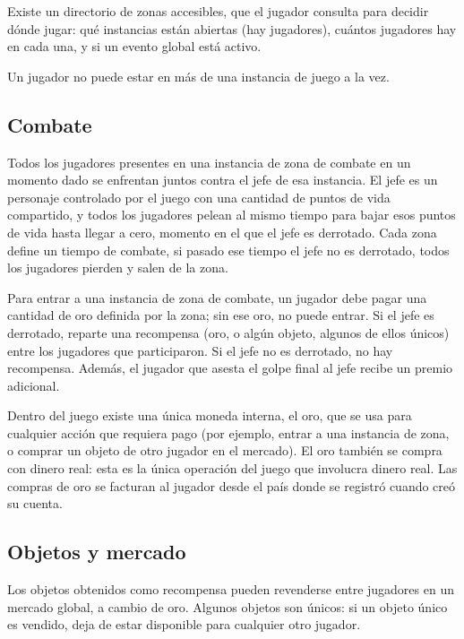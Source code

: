 \documentclass[variant=guia,cover=institutional,mode=screen]{ua-engineering-v6-article}
\begin{document}
    Existe un directorio de zonas accesibles, que el jugador consulta para decidir dónde jugar: qué instancias están abiertas (hay jugadores), cuántos jugadores hay en cada una, y si un evento global está activo.

    Un jugador no puede estar en más de una instancia de juego a la vez.

    \subsection{Combate}\label{subsec:combate}

    Todos los jugadores presentes en una instancia de zona de combate en un momento dado se enfrentan juntos contra el jefe de esa instancia.
    El jefe es un personaje controlado por el juego con una cantidad de puntos de vida compartido, y todos los jugadores pelean al mismo tiempo para bajar esos puntos de vida hasta llegar a cero, momento en el que el jefe es derrotado.
    Cada zona define un tiempo de combate, si pasado ese tiempo el jefe no es derrotado, todos los jugadores pierden y salen de la zona.

    Para entrar a una instancia de zona de combate, un jugador debe pagar una cantidad de oro definida por la zona; sin ese oro, no puede entrar.
    Si el jefe es derrotado, reparte una recompensa (oro, o algún objeto, algunos de ellos únicos) entre los jugadores que participaron.
    Si el jefe no es derrotado, no hay recompensa.
    Además, el jugador que asesta el golpe final al jefe recibe un premio adicional.

    Dentro del juego existe una única moneda interna, el oro, que se usa para cualquier acción que requiera pago (por ejemplo, entrar a una instancia de zona, o comprar un objeto de otro jugador en el mercado).
    El oro también se compra con dinero real: esta es la única operación del juego que involucra dinero real.
    Las compras de oro se facturan al jugador desde el país donde se registró cuando creó su cuenta.

    \subsection{Objetos y mercado}\label{subsec:objetos-mercado}

    Los objetos obtenidos como recompensa pueden revenderse entre jugadores en un mercado global, a cambio de oro.
    Algunos objetos son únicos: si un objeto único es vendido, deja de estar disponible para cualquier otro jugador.
\end{document}
